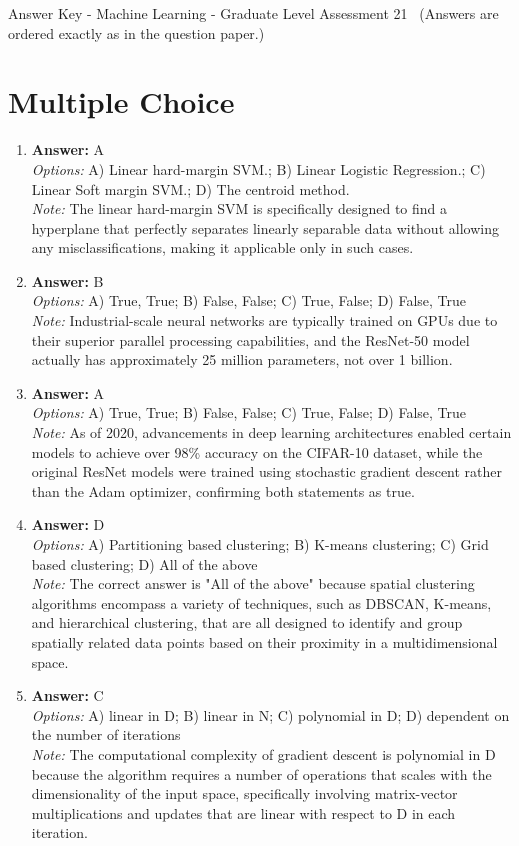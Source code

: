 \documentclass[12pt]{article}
\begin{document}
\begin{center}
Answer Key - Machine Learning - Graduate Level Assessment 21 \
\small (Answers are ordered exactly as in the question paper.)
\end{center}

\section*{Multiple Choice}
\begin{enumerate}[label=\arabic*.]
\item \textbf{Answer:} A
\\ \textit{Options:} A) Linear hard-margin SVM.; B) Linear Logistic Regression.; C) Linear Soft margin SVM.; D) The centroid method.
\\ \textit{Note:} The linear hard-margin SVM is specifically designed to find a hyperplane that perfectly separates linearly separable data without allowing any misclassifications, making it applicable only in such cases.
\item \textbf{Answer:} B
\\ \textit{Options:} A) True, True; B) False, False; C) True, False; D) False, True
\\ \textit{Note:} Industrial-scale neural networks are typically trained on GPUs due to their superior parallel processing capabilities, and the ResNet-50 model actually has approximately 25 million parameters, not over 1 billion.
\item \textbf{Answer:} A
\\ \textit{Options:} A) True, True; B) False, False; C) True, False; D) False, True
\\ \textit{Note:} As of 2020, advancements in deep learning architectures enabled certain models to achieve over 98\% accuracy on the CIFAR-10 dataset, while the original ResNet models were trained using stochastic gradient descent rather than the Adam optimizer, confirming both statements as true.
\item \textbf{Answer:} D
\\ \textit{Options:} A) Partitioning based clustering; B) K-means clustering; C) Grid based clustering; D) All of the above
\\ \textit{Note:} The correct answer is "All of the above" because spatial clustering algorithms encompass a variety of techniques, such as DBSCAN, K-means, and hierarchical clustering, that are all designed to identify and group spatially related data points based on their proximity in a multidimensional space.
\item \textbf{Answer:} C
\\ \textit{Options:} A) linear in D; B) linear in N; C) polynomial in D; D) dependent on the number of iterations
\\ \textit{Note:} The computational complexity of gradient descent is polynomial in D because the algorithm requires a number of operations that scales with the dimensionality of the input space, specifically involving matrix-vector multiplications and updates that are linear with respect to D in each iteration.
\end{enumerate}
\end{document}
